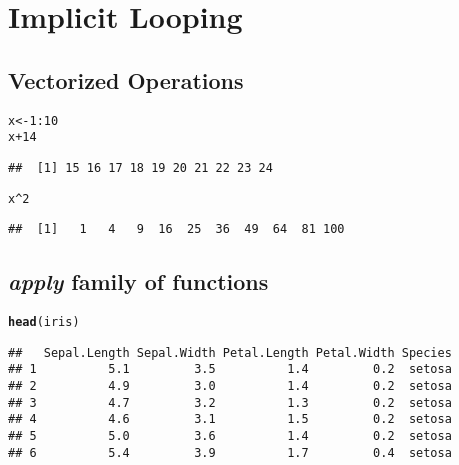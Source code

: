\documentclass[11pt, a4paper]{article}\usepackage[]{graphicx}\usepackage[]{xcolor}
\makeatletter
\newcommand{\hlnum}[1]{\textcolor[rgb]{0.686,0.059,0.569}{#1}}%
\newcommand{\hlopt}[1]{\textcolor[rgb]{0,0,0}{#1}}%
\newcommand{\hldef}[1]{\textcolor[rgb]{0.345,0.345,0.345}{#1}}%
\newcommand{\hlkwb}[1]{\textcolor[rgb]{0.69,0.353,0.396}{#1}}%
\newcommand{\hlkwd}[1]{\textcolor[rgb]{0.737,0.353,0.396}{\textbf{#1}}}%
\newenvironment{kframe}{%
 \def\at@end@of@kframe{}%
 \ifinner\ifhmode%
  \def\at@end@of@kframe{\end{minipage}}%
  \begin{minipage}{\columnwidth}%
 \fi\fi%
 \def\FrameCommand##1{\hskip\@totalleftmargin \hskip-\fboxsep
 \colorbox{shadecolor}{##1}\hskip-\fboxsep
     \hskip-\linewidth \hskip-\@totalleftmargin \hskip\columnwidth}%
 \MakeFramed {\advance\hsize-\width
   \@totalleftmargin\z@ \linewidth\hsize
   \@setminipage}}%
 {\par\unskip\endMakeFramed%
 \at@end@of@kframe}
\newenvironment{knitrout}{}{} %
\makeatother
\begin{document}
\section{Implicit Looping}

\subsection{Vectorized Operations}

\begin{knitrout}
\color{fgcolor}\begin{kframe}
\begin{alltt}
\hldef{x} \hlkwb{<-} \hlnum{1}\hlopt{:}\hlnum{10}
\hldef{x} \hlopt{+} \hlnum{14}
\end{alltt}
\begin{verbatim}
##  [1] 15 16 17 18 19 20 21 22 23 24
\end{verbatim}
\begin{alltt}
\hldef{x}\hlopt{^}\hlnum{2}
\end{alltt}
\begin{verbatim}
##  [1]   1   4   9  16  25  36  49  64  81 100
\end{verbatim}
\end{kframe}
\end{knitrout}

\subsection{\textbf{\textit{apply} family of functions}}

\begin{knitrout}
\color{fgcolor}\begin{kframe}
\begin{alltt}
\hlkwd{head}\hldef{(iris)}
\end{alltt}
\begin{verbatim}
##   Sepal.Length Sepal.Width Petal.Length Petal.Width Species
## 1          5.1         3.5          1.4         0.2  setosa
## 2          4.9         3.0          1.4         0.2  setosa
## 3          4.7         3.2          1.3         0.2  setosa
## 4          4.6         3.1          1.5         0.2  setosa
## 5          5.0         3.6          1.4         0.2  setosa
## 6          5.4         3.9          1.7         0.4  setosa
\end{verbatim}
\end{kframe}
\end{knitrout}
\end{document}
